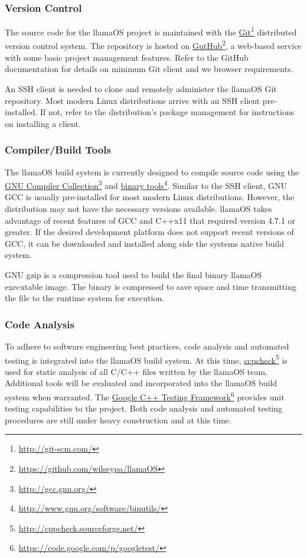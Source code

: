 \documentclass[draft]{article}
\begin{document}
\subsubsection{Version Control}

The source code for the llamaOS project is maintained with the 
\href{http://git-scm.com/}{Git}\footnote{\url{http://git-scm.com/}} 
distributed version control system.  The repository is hosted on 
\href{https://github.com/wilseypa/llamaOS}{GutHub}\footnote{\url{
https://github.com/wilseypa/llamaOS}}, a web-based service with some basic 
project management features.  Refer to the GitHub documentation for details on 
minimum Git client and we browser requirements.

An SSH client is needed to clone and remotely administer the llamaOS Git 
repository.  Most modern Linux distributions arrive with an SSH client 
pre-installed.  If not, refer to the distribution's package management for 
instructions on installing a client.

\subsubsection{Compiler/Build Tools}

The llamaOS build system is currently designed to compile source code using 
the \href{http://gcc.gnu.org/}{GNU Compiler 
Collection}\footnote{\url{http://gcc.gnu.org/}} and 
\href{http://www.gnu.org/software/binutils/}{binary 
tools}\footnote{\url{http://www.gnu.org/software/binutils/}}.  Similar to the 
SSH client, GNU GCC is usually pre-installed for most modern Linux 
distributions.  However, the distribution may not have the necessary versions 
available.  llamaOS takes advantage of recent features of GCC and C++x11 that 
required version 4.7.1 or greater.  If the desired development platform does not 
support recent versions of GCC, it can be downloaded and installed along side 
the systems native build system.

GNU gzip is a compression tool used to build the final binary llamaOS 
executable image. The binary is compressed to save space and time transmitting 
the file to the runtime system for execution.

\subsubsection{Code Analysis}

To adhere to software engineering best practices, code analysis and automated 
testing is integrated into the llamaOS build system.  At this time, 
\href{http://cppcheck.sourceforge.net/}{ccpcheck}\footnote{\url{
http://cppcheck.sourceforge.net/}} is used for static analysis of all C/C++ 
files written by the llamaOS team.  Additional tools will be evaluated and 
incorporated into the llamaOS build system when warranted.  The 
\href{https://code.google.com/p/googletest/}{Google C++ Testing 
Framework}\footnote{\url{https://code.google.com/p/googletest/}} provides unit 
testing capabilities to the project.  Both code analysis and automated testing 
procedures are still under heavy construction and at this time.
\end{document}
